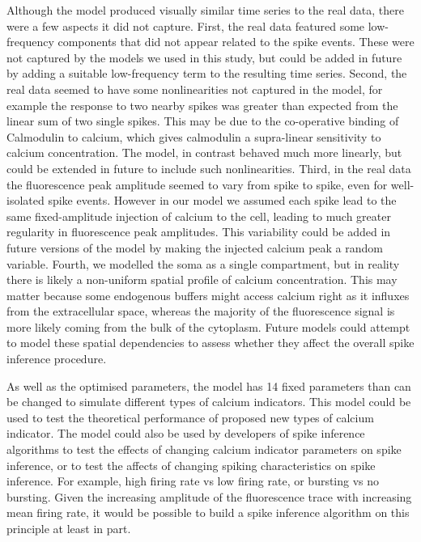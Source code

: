 \documentclass[a4paper,12pt]{article}
\theoremstyle{definition}
\begin{document}
Although the model produced visually similar time series to the real data, there were a few aspects it did not capture. First, the real data featured some low-frequency components that did not appear related to the spike events. These were not captured by the models we used in this study, but could be added in future by adding a suitable low-frequency term to the resulting time series. Second, the real data seemed to have some nonlinearities not captured in the model, for example the response to two nearby spikes was greater than expected from the linear sum of two single spikes. This may be due to the co-operative binding of Calmodulin to calcium, which gives calmodulin a supra-linear sensitivity to calcium concentration. The model, in contrast behaved much more linearly, but could be extended in future to include such nonlinearities. Third, in the real data the fluorescence peak amplitude seemed to vary from spike to spike, even for well-isolated spike events. However in our model we assumed each spike lead to the same fixed-amplitude injection of calcium to the cell, leading to much greater regularity in fluorescence peak amplitudes. This variability could be added in future versions of the model by making the injected calcium peak a random variable. Fourth, we modelled the soma as a single compartment, but in reality there is likely a non-uniform spatial profile of calcium concentration. This may matter because some endogenous buffers might access calcium right as it influxes from the extracellular space, whereas the majority of the fluorescence signal is more likely coming from the bulk of the cytoplasm. Future models could attempt to model these spatial dependencies to assess whether they affect the overall spike inference procedure.

As well as the optimised parameters, the model has 14 fixed parameters than can be changed to simulate different types of calcium indicators. This model could be used to test the theoretical performance of proposed new types of calcium indicator. The model could also be used by developers of spike inference algorithms to test the effects of changing calcium indicator parameters on spike inference, or to test the affects of changing spiking characteristics on spike inference. For example, high firing rate vs low firing rate, or bursting vs no bursting. Given the increasing amplitude of the fluorescence trace with increasing mean firing rate, it would be possible to build a spike inference algorithm on this principle at least in part.
\end{document}
